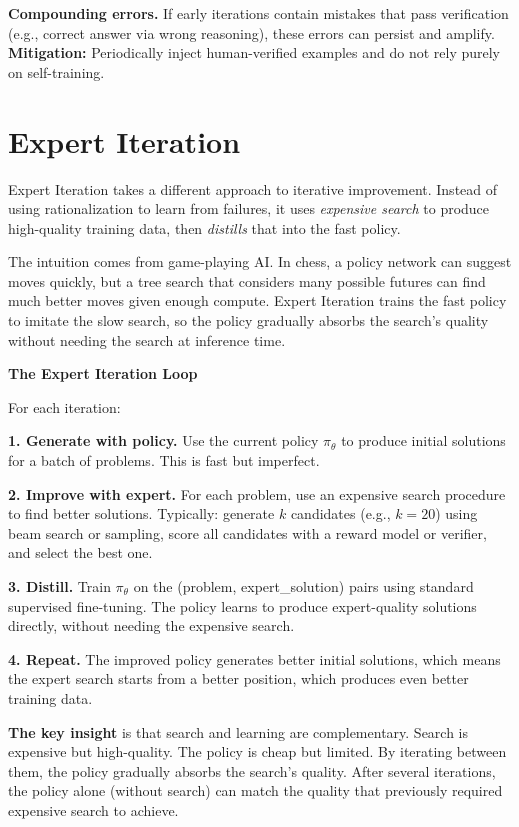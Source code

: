 \begin{chapterenv}
\begin{tipbox}
\textbf{Compounding errors.} If early iterations contain mistakes that pass verification (e.g., correct answer via wrong reasoning), these errors can persist and amplify. \textbf{Mitigation:} Periodically inject human-verified examples and do not rely purely on self-training.
\end{tipbox}

\section{Expert Iteration}

Expert Iteration takes a different approach to iterative improvement. Instead of using rationalization to learn from failures, it uses \textit{expensive search} to produce high-quality training data, then \textit{distills} that into the fast policy.

The intuition comes from game-playing AI. In chess, a policy network can suggest moves quickly, but a tree search that considers many possible futures can find much better moves given enough compute. Expert Iteration trains the fast policy to imitate the slow search, so the policy gradually absorbs the search's quality without needing the search at inference time.

\begin{infobox}
\textbf{The Expert Iteration Loop}

For each iteration:

\textbf{1. Generate with policy.} Use the current policy $\pi_\theta$ to produce initial solutions for a batch of problems. This is fast but imperfect.

\textbf{2. Improve with expert.} For each problem, use an expensive search procedure to find better solutions. Typically: generate $k$ candidates (e.g., $k = 20$) using beam search or sampling, score all candidates with a reward model or verifier, and select the best one.

\textbf{3. Distill.} Train $\pi_\theta$ on the (problem, expert\_solution) pairs using standard supervised fine-tuning. The policy learns to produce expert-quality solutions directly, without needing the expensive search.

\textbf{4. Repeat.} The improved policy generates better initial solutions, which means the expert search starts from a better position, which produces even better training data.
\end{infobox}

\textbf{The key insight} is that search and learning are complementary. Search is expensive but high-quality. The policy is cheap but limited. By iterating between them, the policy gradually absorbs the search's quality. After several iterations, the policy alone (without search) can match the quality that previously required expensive search to achieve.


\end{chapterenv}
